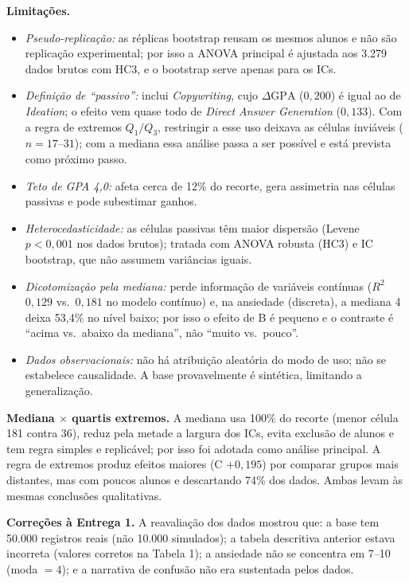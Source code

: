 \documentclass[12pt,a4paper]{article}
\newcommand{\dgpa}{\ensuremath{\Delta\mathrm{GPA}}}
\begin{document}
\textbf{Limita\c{c}\~oes.}
\begin{itemize}
\item \emph{Pseudo-replica\c{c}\~ao:} as r\'eplicas bootstrap reusam os mesmos alunos e n\~ao s\~ao replica\c{c}\~ao experimental; por isso a ANOVA principal \'e ajustada aos 3.279 dados brutos com HC3, e o bootstrap serve apenas para os ICs.
\item \emph{Defini\c{c}\~ao de ``passivo'':} inclui \emph{Copywriting}, cujo \dgpa{} ($0{,}200$) \'e igual ao de \emph{Ideation}; o efeito vem quase todo de \emph{Direct Answer Generation} ($0{,}133$). Com a regra de extremos $Q_1/Q_3$, restringir a esse uso deixava as c\'elulas inviáveis ($n=17$--$31$); com a mediana essa an\'alise passa a ser poss\'ivel e est\'a prevista como pr\'oximo passo.
\item \emph{Teto de GPA 4,0:} afeta cerca de 12\% do recorte, gera assimetria nas c\'elulas passivas e pode subestimar ganhos.
\item \emph{Heterocedasticidade:} as c\'elulas passivas t\^em maior dispers\~ao (Levene $p<0{,}001$ nos dados brutos); tratada com ANOVA robusta (HC3) e IC bootstrap, que n\~ao assumem vari\^ancias iguais.
\item \emph{Dicotomiza\c{c}\~ao pela mediana:} perde informa\c{c}\~ao de vari\'aveis cont\'inuas ($R^2$ $0{,}129$ vs.\ $0{,}181$ no modelo cont\'inuo) e, na ansiedade (discreta), a mediana 4 deixa 53,4\% no n\'ivel baixo; por isso o efeito de B \'e pequeno e o contraste \'e ``acima vs.\ abaixo da mediana'', n\~ao ``muito vs.\ pouco''.
\item \emph{Dados observacionais:} n\~ao h\'a atribui\c{c}\~ao aleat\'oria do modo de uso; n\~ao se estabelece causalidade. A base provavelmente \'e sint\'etica, limitando a generaliza\c{c}\~ao.
\end{itemize}

\textbf{Mediana $\times$ quartis extremos.} A mediana usa 100\% do recorte (menor c\'elula 181 contra 36), reduz pela metade a largura dos ICs, evita exclus\~ao de alunos e tem regra simples e replic\'avel; por isso foi adotada como an\'alise principal. A regra de extremos produz efeitos maiores (C $+0{,}195$) por comparar grupos mais distantes, mas com poucos alunos e descartando 74\% dos dados. Ambas levam \`as mesmas conclus\~oes qualitativas.

\textbf{Corre\c{c}\~oes \`a Entrega 1.} A reavalia\c{c}\~ao dos dados mostrou que: a base tem 50.000 registros reais (n\~ao 10.000 simulados);
a tabela descritiva anterior estava incorreta (valores corretos na Tabela 1); a ansiedade n\~ao se concentra em 7--10 (moda $=4$);
e a narrativa de confus\~ao n\~ao era sustentada pelos dados.
\end{document}

